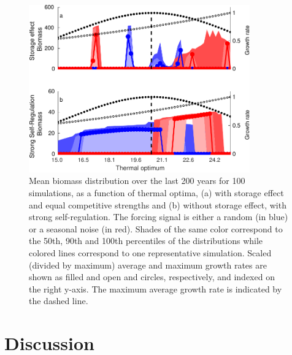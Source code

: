 \documentclass[a4paper,12pt]{article}
\begin{document}
\begin{figure}[!ht]
\begin{centering}
\includegraphics[bb=0bp 0bp 428bp 338bp,width=0.85\textwidth]{Fig4-eps-converted-to.pdf}
\par\end{centering}
\caption{Mean biomass distribution over the last 200 years for 100 simulations,
as a function of thermal optima, (a) with storage effect and equal
competitive strengths and (b) without storage effect, with strong
self-regulation. The forcing signal is either a random (in blue) or
a seasonal noise (in red). Shades of the same color correspond to
the 50th, 90th and 100th percentiles of the distributions while colored
lines correspond to one representative simulation. Scaled (divided
by maximum) average and maximum growth rates are shown as filled and
open and circles, respectively, and indexed on the right y-axis. The
maximum average growth rate is indicated by the dashed line.\label{fig:Unstable_cases}}
\end{figure}


\section{Discussion}
\end{document}
